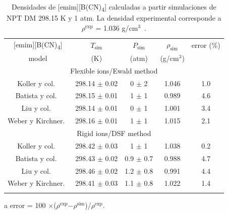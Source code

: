 \documentclass[3p,twocolumn]{elsarticle}
\begin{document}
\begin{table}[htp]
\caption{Densidades de [emim][B(CN)\textsubscript{4}] calculadas a partir simulaciones de NPT DM 298.15 K y 1 atm. La densidad experimental corresponde a $\rho^{\text{exp}}$ = 1.036 g/cm$^{3}$~\cite{Doma_ska_2011}.}
\begin{threeparttable}
\begin{tabular}{ c  c  c  c  c}  
\hline \hline
$\text{[emim]}$[B(CN)\textsubscript{4}] & $T_{\text{sim}}$ & $ P_{\text{sim}} $ & $\rho_{\text{sim}}$ & error (\%)\tnote{a} \\
model & (K) &  (atm) &  (g/cm$^{3}$) &  \\
			\hline
		 \multicolumn{5}{c}{Flexible ions/Ewald method}\\

Koller y col.~\cite{Koller_2012}  & 298.14 $\pm$  0.02 & 0 $\pm$ 2 & 1.046 & 1.0 \\
Batista y col.~\cite{Batista_2015} & 298.15 $\pm$ 0.01  & 1 $\pm$ 1 & 0.989 & 4.6  \\
Liu y col.~\cite{Liu_2014}  & 298.14 $\pm$ 0.01 & 0 $\pm$ 1 & 1.001 & 3.4  \\
Weber y Kirchner.~\cite{Weber_2016}  & 298.16  $\pm$ 0.01 & 1 $\pm$ 1 & 1.015 & 2.1  \\
	 \multicolumn{5}{c}{Rigid ions/DSF method}\\
Koller y col.~\cite{Koller_2012}   & 298.42  $\pm$ 0.03  & 1 $\pm$ 1 & 1.038 & 0.2 \\
Batista y col.~\cite{Batista_2015} & 298.43 $\pm$ 0.02  & 0.9 $\pm$ 0.7  & 0.988 & 4.7  \\
Liu y col.~\cite{Liu_2014}  & 298.46 $\pm$ 0.02 & 1.2  $\pm$ 0.8 & 0.991 &  4.4 \\
Weber y Kirchner.~\cite{Weber_2016} &  298.41 $\pm$ 0.03 & 1.1 $\pm$ 0.8 & 1.022 & 1.4  \\
 \hline \hline
\label{table:props_dsf} 
\end{tabular}
\begin{tablenotes}
\item[a] error = 100 $\times$($\rho^{\text{exp}}$$ - $$\rho^{\text{sim}}$)/$\rho^{\text{exp}}$.
\end{tablenotes}
\end{threeparttable}
\end{table}
\end{document}
